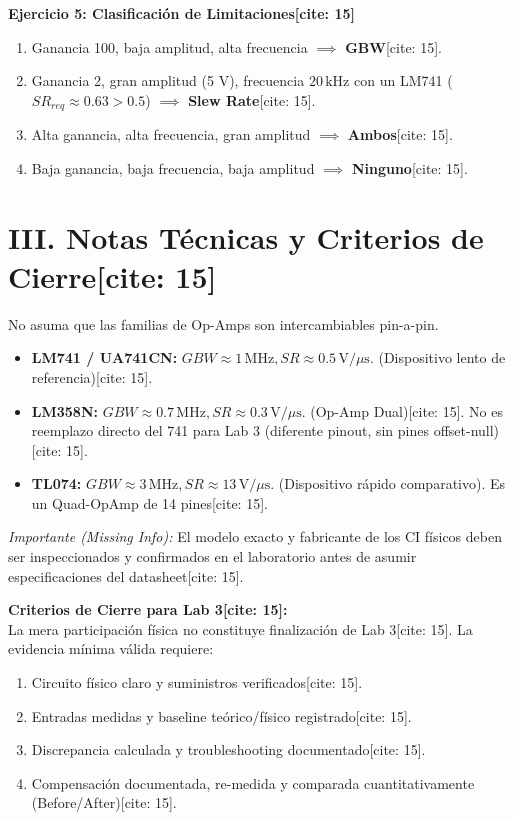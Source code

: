 \documentclass[11pt, a4paper]{article}
\begin{document}
\textbf{Ejercicio 5: Clasificación de Limitaciones[cite: 15]}
\begin{enumerate}
    \item Ganancia 100, baja amplitud, alta frecuencia $\implies$ \textbf{GBW}[cite: 15].
    \item Ganancia 2, gran amplitud (5 V), frecuencia $20\,\text{kHz}$ con un LM741 ($SR_{req} \approx 0.63 > 0.5$) $\implies$ \textbf{Slew Rate}[cite: 15].
    \item Alta ganancia, alta frecuencia, gran amplitud $\implies$ \textbf{Ambos}[cite: 15].
    \item Baja ganancia, baja frecuencia, baja amplitud $\implies$ \textbf{Ninguno}[cite: 15].
\end{enumerate}

\section*{III. Notas Técnicas y Criterios de Cierre[cite: 15]}

\begin{tcolorbox}[colback=white, colframe=black, title=\textbf{Inventario y Estrategia de Dispositivos (Lab 4)[cite: 15]}]
    No asuma que las familias de Op-Amps son intercambiables pin-a-pin.
    \begin{itemize}
        \item \textbf{LM741 / UA741CN:} $GBW \approx 1\,\text{MHz}, SR \approx 0.5\,\text{V}/\mu\text{s}$. (Dispositivo lento de referencia)[cite: 15].
        \item \textbf{LM358N:} $GBW \approx 0.7\,\text{MHz}, SR \approx 0.3\,\text{V}/\mu\text{s}$. (Op-Amp Dual)[cite: 15]. No es reemplazo directo del 741 para Lab 3 (diferente pinout, sin pines offset-null)[cite: 15].
        \item \textbf{TL074:} $GBW \approx 3\,\text{MHz}, SR \approx 13\,\text{V}/\mu\text{s}$. (Dispositivo rápido comparativo). Es un Quad-OpAmp de 14 pines[cite: 15].
    \end{itemize}
    \textit{Importante (Missing Info):} El modelo exacto y fabricante de los CI físicos deben ser inspeccionados y confirmados en el laboratorio antes de asumir especificaciones del datasheet[cite: 15].
\end{tcolorbox}

\textbf{Criterios de Cierre para Lab 3[cite: 15]:} \\
La mera participación física no constituye finalización de Lab 3[cite: 15]. La evidencia mínima válida requiere:
\begin{enumerate}
    \item Circuito físico claro y suministros verificados[cite: 15].
    \item Entradas medidas y baseline teórico/físico registrado[cite: 15].
    \item Discrepancia calculada y troubleshooting documentado[cite: 15].
    \item Compensación documentada, re-medida y comparada cuantitativamente (Before/After)[cite: 15].
\end{enumerate}
\end{document}

